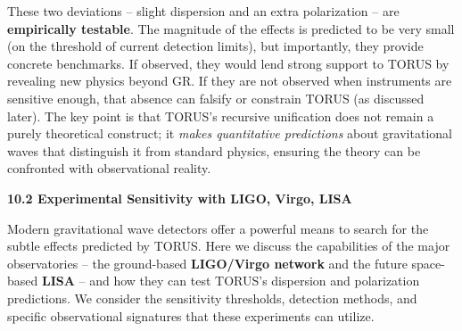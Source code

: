 \documentclass[]{article}
\begin{document}
These two deviations -- slight dispersion and an extra polarization --
are \textbf{empirically testable}. The magnitude of the effects is
predicted to be very small (on the threshold of current detection
limits), but importantly, they provide concrete benchmarks. If observed,
they would lend strong support to TORUS by revealing new physics beyond
GR. If they are not observed when instruments are sensitive enough, that
absence can falsify or constrain TORUS (as discussed later). The key
point is that TORUS's recursive unification does not remain a purely
theoretical construct; it \emph{makes quantitative predictions} about
gravitational waves that distinguish it from standard physics, ensuring
the theory can be confronted with observational reality​.

\textbf{10.2 Experimental Sensitivity with LIGO, Virgo, LISA}

Modern gravitational wave detectors offer a powerful means to search for
the subtle effects predicted by TORUS. Here we discuss the capabilities
of the major observatories -- the ground-based \textbf{LIGO/Virgo
network} and the future space-based \textbf{LISA} -- and how they can
test TORUS's dispersion and polarization predictions. We consider the
sensitivity thresholds, detection methods, and specific observational
signatures that these experiments can utilize.
\end{document}
